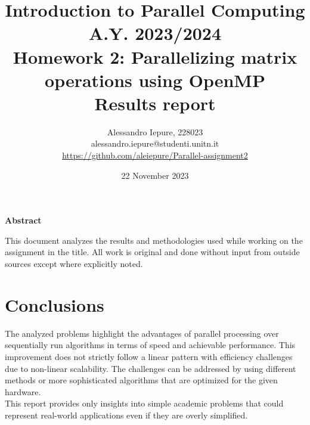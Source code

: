 \documentclass{article}
\begin{document}
    \title{Introduction to Parallel Computing\\%
    A.Y. 2023/2024\\%
    Homework 2: Parallelizing matrix operations using OpenMP\\%
    \textbf{Results report}}
    \author{%
        Alessandro Iepure, 228023\\%
        alessandro.iepure@studenti.unitn.it\\%
        \url{https://github.com/aleiepure/Parallel-assignment2}
    }
    \date{22 November 2023}
    \maketitle

    \begin{center}
        \textbf{Abstract}
    \end{center}
    This document analyzes the results and methodologies used while working on %
    the assignment in the title. All work is original and done without input %
    from outside sources except where explicitly noted.

    
    
    \clearpage

    \section*{Conclusions}
    The analyzed problems highlight the advantages of parallel processing %
    over sequentially run algorithms in terms of speed and achievable performance. %
    This improvement does not strictly follow a linear pattern with efficiency challenges %
    due to non-linear scalability. The challenges can be addressed by using %
    different methods or more sophisticated algorithms that are optimized %
    for the given hardware.\\%
    This report provides only insights into simple academic problems that could %
    represent real-world applications even if they are overly simplified.
    
    \printbibliography
\end{document}
